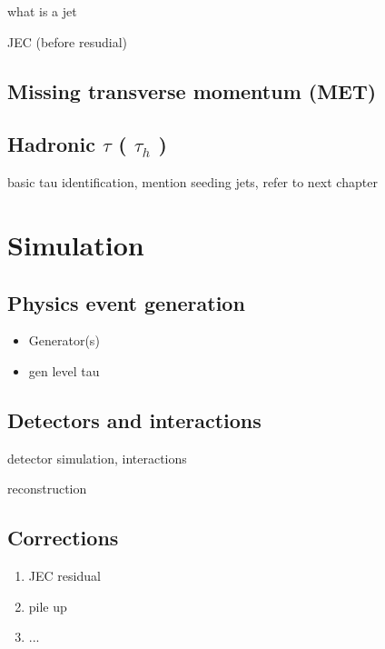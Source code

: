 what is a jet

JEC (before resudial)

\subsection{Missing transverse momentum (MET)}

\subsection{Hadronic $\tau$ ( $\tau_{h}$ )}

basic tau identification, mention seeding jets, refer to next chapter

\section{Simulation}

\subsection{Physics event generation} 
\label{sec:cms_physics_event_generation}

\begin{itemize}
\item Generator(s)
\item gen level tau
\end{itemize}

\subsection{Detectors and interactions}

detector simulation, interactions

reconstruction

\subsection{Corrections}

\begin{enumerate}
\item JEC residual
\item pile up
\item ...
\end{enumerate}